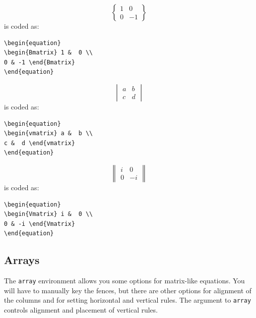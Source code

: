 \documentclass[]{IEEEtran}
\begin{document}
\begin{equation}
	\begin{Bmatrix} 1 & 0  \\
                0 & -1\end{Bmatrix}
\end{equation}
is coded as:
\begin{verbatim}
\begin{equation}
\begin{Bmatrix} 1 &  0 \\ 
0 & -1 \end{Bmatrix}
\end{equation}\end{verbatim}

\begin{equation}
	\begin{vmatrix} a & b \\
                c & d\end{vmatrix}
\end{equation}
is coded as:
\begin{verbatim}
\begin{equation}
\begin{vmatrix} a &  b \\ 
c &  d \end{vmatrix}
\end{equation}\end{verbatim}

\begin{equation}
	\begin{Vmatrix} i & 0  \\
                0 & -i\end{Vmatrix}
\end{equation}
is coded as:
\begin{verbatim}
\begin{equation}
\begin{Vmatrix} i &  0 \\ 
0 & -i \end{Vmatrix}
\end{equation}\end{verbatim}

\subsection{Arrays}
The {\tt{array}} environment allows you some options for matrix-like equations. You will have to manually key the fences, but there are other options for alignment of the columns and for setting horizontal and vertical rules. The argument to {\tt{array}} controls alignment and placement of vertical rules.
\end{document}
